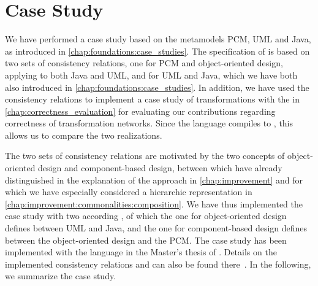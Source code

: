 \section{Case Study}

We have performed a case study based on the metamodels \gls{PCM}, \gls{UML} and Java, as introduced in \autoref{chap:foundations:case_studies}.
The specification of \commonalities is based on two sets of consistency relations, one for \gls{PCM} and object-oriented design, applying to both Java and \gls{UML}, and for \gls{UML} and Java, which we have both also introduced in \autoref{chap:foundations:case_studies}.
In addition, we have used the consistency relations to implement a case study of transformations with the \reactionslanguage in \autoref{chap:correctness_evaluation} for evaluating our contributions regarding correctness of transformation networks.
Since the \commonalities language compiles to \reactions, this allows us to compare the two realizations.

The two sets of consistency relations are motivated by the two concepts of object-oriented design and component-based design, between which have already distinguished in the explanation of the \commonalities approach in \autoref{chap:improvement} and for which we have especially considered a hierarchic representation in \autoref{chap:improvement:commonalities:composition}.
We have thus implemented the case study with two according \conceptmetamodels, of which the one for object-oriented design defines \commonalities between \gls{UML} and Java, and the one for component-based design defines \commonalities between the object-oriented design \conceptmetamodel and the \gls{PCM}.
The case study has been implemented with the \commonalities language in the Master's thesis of .
Details on the implemented consistency relations and \commonalities can also be found there~.
In the following, we summarize the case study.


